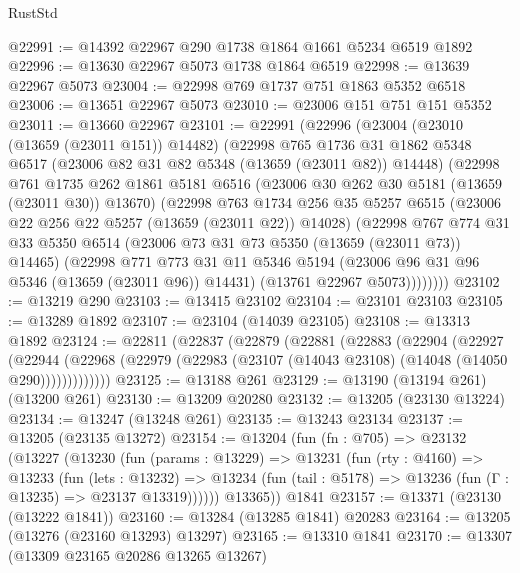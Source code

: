 \begin{lexlean}{RustStd}
\begin{coremodule}
@22991 := @14392 @22967 @290 @1738 @1864 @1661 @5234 @6519 @1892
@22996 := @13630 @22967 @5073 @1738 @1864 @6519
@22998 := @13639 @22967 @5073
@23004 := @22998 @769 @1737 @751 @1863 @5352 @6518
@23006 := @13651 @22967 @5073
@23010 := @23006 @151 @751 @151 @5352
@23011 := @13660 @22967
@23101 := @22991
    (@22996
      (@23004
        (@23010 (@13659 (@23011 @151)) @14482)
        (@22998
          @765
          @1736
          @31
          @1862
          @5348
          @6517
          (@23006 @82 @31 @82 @5348 (@13659 (@23011 @82)) @14448)
          (@22998
            @761
            @1735
            @262
            @1861
            @5181
            @6516
            (@23006 @30 @262 @30 @5181 (@13659 (@23011 @30)) @13670)
            (@22998
              @763
              @1734
              @256
              @35
              @5257
              @6515
              (@23006 @22 @256 @22 @5257 (@13659 (@23011 @22)) @14028)
              (@22998
                @767
                @774
                @31
                @33
                @5350
                @6514
                (@23006 @73 @31 @73 @5350 (@13659 (@23011 @73)) @14465)
                (@22998
                  @771
                  @773
                  @31
                  @11
                  @5346
                  @5194
                  (@23006 @96 @31 @96 @5346 (@13659 (@23011 @96)) @14431)
                  (@13761 @22967 @5073))))))))
@23102 := @13219 @290
@23103 := @13415 @23102
@23104 := @23101 @23103
@23105 := @13289 @1892
@23107 := @23104 (@14039 @23105)
@23108 := @13313 @1892
@23124 := @22811
    (@22837
      (@22879
        (@22881
          (@22883
            (@22904
              (@22927
                (@22944
                  (@22968 (@22979 (@22983 (@23107 (@14043 @23108) (@14048 (@14050 @290)))))))))))))
@23125 := @13188 @261
@23129 := @13190 (@13194 @261) (@13200 @261)
@23130 := @13209 @20280
@23132 := @13205 (@23130 @13224)
@23134 := @13247 (@13248 @261)
@23135 := @13243 @23134
@23137 := @13205 (@23135 @13272)
@23154 := @13204
    (fun (fn : @705) =>
    @23132
      (@13227
        (@13230
          (fun (params : @13229) =>
          @13231
            (fun (rty : @4160) =>
            @13233
              (fun (lets : @13232) =>
              @13234 (fun (tail : @5178) => @13236 (fun (Γ : @13235) => @23137 @13319))))))
        @13365))
    @1841
@23157 := @13371 (@23130 (@13222 @1841))
@23160 := @13284 (@13285 @1841) @20283
@23164 := @13205 (@13276 (@23160 @13293) @13297)
@23165 := @13310 @1841
@23170 := @13307 (@13309 @23165 @20286 @13265 @13267)

\end{coremodule}
\end{lexlean}
